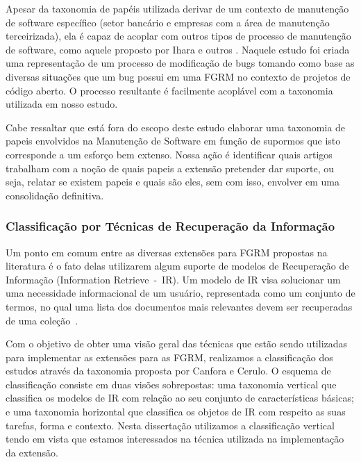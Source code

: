 Apesar da taxonomia de papéis utilizada derivar de um contexto de manutenção de
software específico (setor bancário e empresas com a área de manutenção
terceirizada), ela é capaz de acoplar com outros tipos de processo de manutenção
de software, como aquele proposto por Ihara e outros
\cite{Ihara:2009:AMI:1595808.1595833}. Naquele estudo foi criada uma
representação de um processo de modificação de bugs tomando como base as
diversas situações que um bug possui em uma FGRM no contexto de projetos de
código aberto. O processo resultante é facilmente acoplável com a taxonomia
utilizada em nosso estudo.

Cabe ressaltar que está fora do escopo deste estudo elaborar uma taxonomia de
papeis envolvidos na Manutenção de Software em função de supormos que isto
corresponde a um esforço bem extenso. Nossa ação é identificar quais artigos
trabalham com a noção de quais papeis a extensão pretender dar suporte,  ou
seja,  relatar se existem papeis e quais são eles,  sem com isso, envolver em
uma consolidação definitiva.

\subsubsection{Classificação por Técnicas de Recuperação da Informação}
\label{subsubsec:map-esaquema-tecnicas-ir}

Um ponto em comum entre as diversas extensões para FGRM propostas na literatura
é o fato delas utilizarem algum suporte de modelos de Recuperação de Informação
(Information Retrieve~-~IR). Um modelo de IR visa solucionar um uma necessidade
informacional de um usuário, representada como um conjunto de termos, no qual
uma lista dos documentos mais relevantes devem ser recuperadas de uma
coleção~\cite{baeza1999modern}.

Com o objetivo de obter uma visão geral das técnicas que estão sendo utilizadas
para implementar as extensões para as FGRM, realizamos a classificação dos
estudos através da taxonomia proposta por Canfora e
Cerulo\cite{cerulo2004taxonomy}. O esquema de classificação consiste em duas
visões sobrepostas: uma taxonomia vertical que classifica os modelos de IR com
relação ao seu conjunto de características básicas; e uma taxonomia horizontal
que classifica os objetos de IR com respeito as suas tarefas, forma e
contexto\cite{cerulo2004taxonomy}. Nesta dissertação utilizamos a classificação
vertical tendo em vista que estamos interessados na técnica utilizada na
implementação da extensão.

